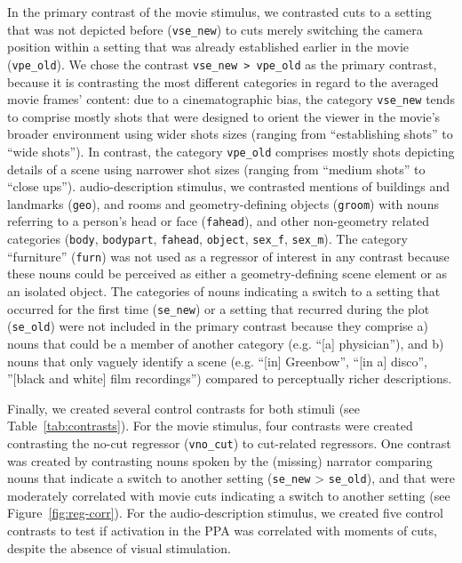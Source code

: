 \documentclass[english,11pt]{article}
\begin{document}
In the primary contrast of the movie stimulus, we contrasted cuts to a setting
that was not depicted before (\texttt{vse\_new}) to cuts merely switching the
camera position within a setting that was already established earlier in the
movie (\texttt{vpe\_old}).
We chose the contrast \texttt{vse\_new > vpe\_old} as the primary contrast,
because it is contrasting the most different categories in regard to the
averaged movie frames' content:
due to a cinematographic bias, the category \texttt{vse\_new} tends to comprise
mostly shots that were designed to orient the viewer in the movie's broader
environment using wider shots sizes (ranging from ``establishing shots'' to
``wide shots'').
In contrast, the category \texttt{vpe\_old} comprises mostly
shots depicting details of a scene using narrower shot sizes (ranging from
``medium shots'' to ``close ups'').
audio-description stimulus, we contrasted mentions of buildings and landmarks
(\texttt{geo}), and rooms and geometry-defining objects (\texttt{groom}) with
nouns referring to a person's head or face (\texttt{fahead}), and other
non-geometry related categories (\texttt{body}, \texttt{bodypart},
\texttt{fahead}, \texttt{object}, \texttt{sex\_f}, \texttt{sex\_m}).
The category ``furniture'' (\texttt{furn}) was not used as a regressor of
interest in any contrast because these nouns could be perceived as either a
geometry-defining scene element or as an isolated object.
The categories of nouns indicating a switch to a setting that occurred for the
first time (\texttt{se\_new}) or a setting that recurred during the plot
(\texttt{se\_old}) were not included in the primary contrast because they
comprise
a)  nouns that could be a member of another category (e.g. ``[a] physician''),
and
b) nouns that only vaguely identify a scene (e.g. ``[in] Greenbow'', ``[in a]
disco'', ''[black and white] film recordings'') compared to perceptually richer
descriptions.

Finally, we created several control contrasts for both stimuli
(see Table~\ref{tab:contrasts}).
For the movie stimulus, four contrasts were created contrasting the no-cut
regressor (\texttt{vno\_cut}) to cut-related regressors.
One contrast was created by contrasting nouns spoken by the (missing) narrator
comparing nouns
%
that indicate a switch to another setting (\texttt{se\_new} >
\texttt{se\_old}), and
%
that were moderately correlated with movie cuts indicating a
switch to another setting (see Figure~\ref{fig:reg-corr}).
For the audio-description stimulus, we created five control contrasts to test if
activation in the PPA was correlated with moments of cuts, despite the absence
of visual stimulation.
\end{document}
